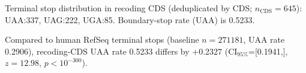 Terminal stop distribution in recoding CDS (deduplicated by CDS; $n_\mathrm{CDS}=645$): UAA:337, UAG:222, UGA:85. Boundary-stop rate (UAA) is 0.5233.

Compared to human RefSeq terminal stops (baseline $n=271181$, UAA rate 0.2906), recoding-CDS UAA rate 0.5233 differs by +0.2327 (CI$_{95\%}$=[0.1941,], $z=12.98$, $p<10^{-300}$).
